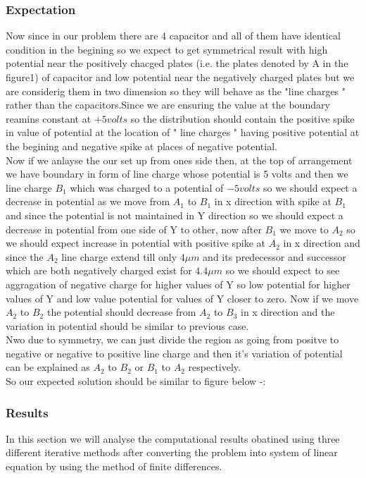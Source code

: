 \subsubsection{Expectation}
Now since in our problem there are 4 capacitor and all of them have identical condition in the begining so we expect to get symmetrical result with high potential near the positively chacged plates (i.e. the plates denoted by A  in the figure1) of capacitor and low potential near the negatively charged plates but we are considerig them in two dimension so they will behave as the "line charges " rather than the capacitors.Since we are ensuring the value at the boundary reamins constant at $ +5 volts $ so the distribution should contain the positive spike in value of potential at the location of " line charges " having positive potential at the begining and negative spike at places of negative potential. \\
Now if we anlayse the our set up from ones side then, at the top of arrangement we have boundary in form of line charge whose potential is 5 volts and then we line charge $ B_1$ which was charged to a potential of $ -5 volts $ so we should expect a decrease in potential as we move from $ A_1 $ to $ B_1 $ in x direction with spike at $ B_1 $ and since the potential is not maintained in Y direction so we should expect a decrease in potential from one side of Y to other, now after $ B_1 $ we move to $ A_2 $ so we should expect increase in potential with positive spike at $ A_2 $ in x direction and since the $ A_2 $ line charge extend till only $ 4 \mu m $ and its predecessor and successor which are both negatively charged exist for $ 4.4 \mu m $ so we should expect to see aggragation of negative charge for higher values of Y so low potential for higher values of Y and low value potential for values of Y closer to zero. Now if we move $ A_2 $ to $ B_2 $ the potential should decrease from $ A_2 $ to $ B_3 $ in x direction and the variation in potential should be similar to previous case.\\
Nwo due to symmetry, we can just divide the region as going from positve to negative or negative to positive line charge and then it's variation of potential can be explained as $ A_2 $ to $ B_2 $ or $ B_1 $ to $ A_2 $ respectively.\\
So our expected solution should be similar to figure below -:\\

\subsubsection{Results}
In this section we will analyse the computational results obatined using three different iterative methods after converting the problem into system of linear equation by using the method of finite differences. 
